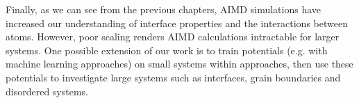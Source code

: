 Finally, as we can see from the previous chapters, AIMD simulations have increased our understanding of interface properties and the interactions between atoms.
However, poor scaling renders AIMD calculations intractable for larger systems.
One possible extension of our work is to train potentials (e.g. with machine learning approaches\cite{Norvig2010}) on small systems within \abinitio approaches\cite{Behler2007,Behler2011,Behler2014,Kolb2017}, 
then use these potentials to investigate large systems such as interfaces, grain boundaries and disordered systems.




